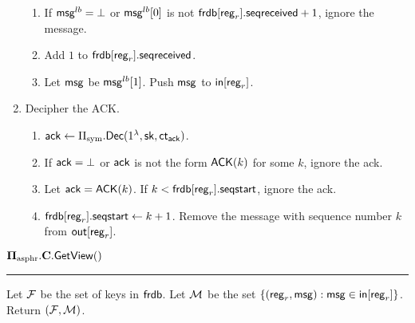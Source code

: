 \begin{definition}
\begin{enumerate}
\begin{enumerate}
        \item If $\mathsf{msg}^{lb} = \bot$ or $\mathsf{msg}^{lb}[0]$ is not $\mathsf{frdb}[\mathsf{reg}_r].\mathsf{seqreceived} + 1$, ignore the message.
        \item Add $1$ to $\mathsf{frdb}[\mathsf{reg}_r].\mathsf{seqreceived}$. 
        \item Let $\mathsf{msg}$ be $\mathsf{msg}^{lb}[1]$. Push $\mathsf{msg}$ to $\mathsf{in}[\mathsf{reg}_r]$.
    \end{enumerate}
    \item Decipher the ACK.
    \begin{enumerate}
        \item $\mathsf{ack} \leftarrow \Pi_{\text{sym}}.\mathsf{Dec}(1^{\lambda}, {\mathsf{sk}}, \mathsf{ct}_{\mathsf{ack}})$.
        \item If $\mathsf{ack} = \bot$ or $\mathsf{ack}$ is not the form $\mathsf{ACK}(k)$ for some $k$, ignore the ack.
        \item Let $\mathsf{ack} = \mathsf{ACK}(k)$. If $k < \mathsf{frdb}[\mathsf{reg}_r].\mathsf{seqstart}$, ignore the ack.
        \item $\mathsf{frdb}[\mathsf{reg}_r].\mathsf{seqstart} \leftarrow k + 1$. Remove the message with sequence number $k$ from $\mathsf{out}[\mathsf{reg}_r]$.
    \end{enumerate}
\end{enumerate}
\vspace{10pt}
$\mathbf{\Pi_{\text{asphr}}.C.\mathsf{GetView}}()$
\vspace{5pt}
\hrule
\vspace{5pt}
Let $\mathcal{F}$ be the set of keys in $\mathsf{frdb}$. Let $\mathcal{M}$ be the set $\{(\mathsf{reg}_r, \mathsf{msg}): \mathsf{msg} \in \mathsf{in}[\mathsf{reg}_r]\}$. Return $(\mathcal{F}, \mathcal{M})$.

\end{definition}